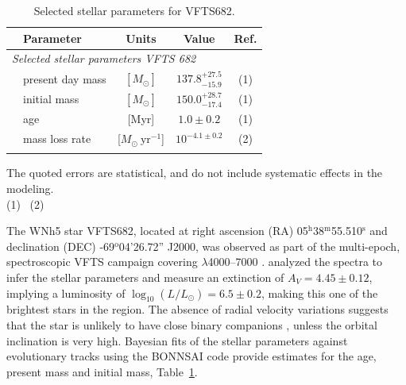 \documentclass[apjl,twocolumn]{emulateapj}
\DeclareRobustCommand{\Tabref}[1]{Table~\ref{#1}}
\begin{document}
\begin{table}
  \begin{center}
    \caption{Selected stellar parameters for VFTS682. }
    \begin{tabular}{llc|c|c}
      \hline
      \hline
      &Parameter & Units & Value & Ref.\\
     
       \hline
       \multicolumn{5}{l}{\emph{Selected stellar parameters VFTS 682}}
      \\
      \hline
     & present day mass  & $[M_\odot]$ & $137.8^{+27.5}_
                                           {-15.9}$ & (1)
                                                    \\
      & initial mass& $[M_\odot]$ & $150.0^{+28.7}_{-17.4}$ & (1)
      \\
      &age & [Myr] & $1.0\pm0.2$ & (1) \\
      &mass loss rate & [$M_\odot \ \mathrm{yr}^{-1}$] & $10^{-4.1\pm0.2}$ & (2)\\
      \hline
      \label{tab:star_param}
    \end{tabular}
    \tablecomments
    {
      The quoted errors are statistical, and do not include systematic
      effects in the modeling.\\
      (1)~\cite{schneider:18}
      (2)~\cite{bestenlehner:11}
    }
  \end{center}
\end{table}



The WNh5 star VFTS682, located at right ascension (RA)
05$^\mathrm{h}$38$^\mathrm{m}$55.510$^\mathrm{s}$  and declination
(DEC) \mbox{-69$^\mathrm{o}$04'26.72''} J2000, was observed as part of the multi-epoch, spectroscopic VFTS campaign covering $\lambda$4000--7000 \citep[][]{evans:11}. 
\citet{bestenlehner:11}  analyzed the spectra to infer the stellar
parameters and measure an extinction of $A_V=4.45\pm0.12$, implying a
luminosity of $\log_{10}(L/L_\odot) =  6.5\pm0.2$, making this one of
the brightest stars in the region. The absence of radial velocity
variations suggests that the star is unlikely to have close binary
companions \citet{bestenlehner:11}, unless the orbital inclination is
very high. Bayesian fits of the stellar
parameters against evolutionary tracks \citep{brott:11, kohler:15}
using the BONNSAI code \citep{schneider:17, schneider:18} provide
estimates for the age, present mass and initial mass, %
\Tabref{tab:star_param}. %
\end{document}
